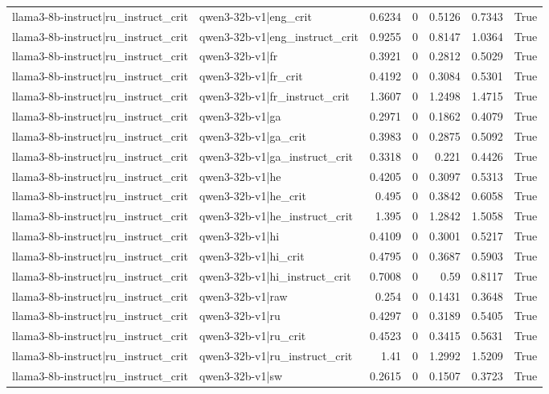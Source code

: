 \begin{table}
\begin{tabular}{l l r r r r l}
llama3-8b-instruct|ru_instruct_crit & qwen3-32b-v1|eng_crit & 0.6234 & 0 & 0.5126 & 0.7343 & True \\
llama3-8b-instruct|ru_instruct_crit & qwen3-32b-v1|eng_instruct_crit & 0.9255 & 0 & 0.8147 & 1.0364 & True \\
llama3-8b-instruct|ru_instruct_crit & qwen3-32b-v1|fr & 0.3921 & 0 & 0.2812 & 0.5029 & True \\
llama3-8b-instruct|ru_instruct_crit & qwen3-32b-v1|fr_crit & 0.4192 & 0 & 0.3084 & 0.5301 & True \\
llama3-8b-instruct|ru_instruct_crit & qwen3-32b-v1|fr_instruct_crit & 1.3607 & 0 & 1.2498 & 1.4715 & True \\
llama3-8b-instruct|ru_instruct_crit & qwen3-32b-v1|ga & 0.2971 & 0 & 0.1862 & 0.4079 & True \\
llama3-8b-instruct|ru_instruct_crit & qwen3-32b-v1|ga_crit & 0.3983 & 0 & 0.2875 & 0.5092 & True \\
llama3-8b-instruct|ru_instruct_crit & qwen3-32b-v1|ga_instruct_crit & 0.3318 & 0 & 0.221 & 0.4426 & True \\
llama3-8b-instruct|ru_instruct_crit & qwen3-32b-v1|he & 0.4205 & 0 & 0.3097 & 0.5313 & True \\
llama3-8b-instruct|ru_instruct_crit & qwen3-32b-v1|he_crit & 0.495 & 0 & 0.3842 & 0.6058 & True \\
llama3-8b-instruct|ru_instruct_crit & qwen3-32b-v1|he_instruct_crit & 1.395 & 0 & 1.2842 & 1.5058 & True \\
llama3-8b-instruct|ru_instruct_crit & qwen3-32b-v1|hi & 0.4109 & 0 & 0.3001 & 0.5217 & True \\
llama3-8b-instruct|ru_instruct_crit & qwen3-32b-v1|hi_crit & 0.4795 & 0 & 0.3687 & 0.5903 & True \\
llama3-8b-instruct|ru_instruct_crit & qwen3-32b-v1|hi_instruct_crit & 0.7008 & 0 & 0.59 & 0.8117 & True \\
llama3-8b-instruct|ru_instruct_crit & qwen3-32b-v1|raw & 0.254 & 0 & 0.1431 & 0.3648 & True \\
llama3-8b-instruct|ru_instruct_crit & qwen3-32b-v1|ru & 0.4297 & 0 & 0.3189 & 0.5405 & True \\
llama3-8b-instruct|ru_instruct_crit & qwen3-32b-v1|ru_crit & 0.4523 & 0 & 0.3415 & 0.5631 & True \\
llama3-8b-instruct|ru_instruct_crit & qwen3-32b-v1|ru_instruct_crit & 1.41 & 0 & 1.2992 & 1.5209 & True \\
llama3-8b-instruct|ru_instruct_crit & qwen3-32b-v1|sw & 0.2615 & 0 & 0.1507 & 0.3723 & True \\

\end{tabular}
\end{table}
